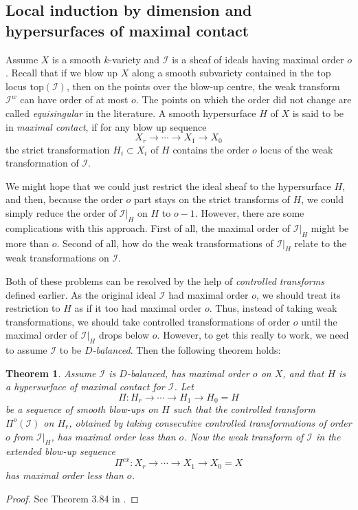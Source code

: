 \documentclass[12pt,a4paper,leqno]{article}
\theoremstyle{plain}
\newtheorem{thm}[theo]{Theorem}
\theoremstyle{definition}
\theoremstyle{remark}
\begin{document}
\subsection{Local induction by dimension and hypersurfaces of maximal contact}

Assume $X$ is a smooth $k$-variety and $\mathscr{I}$ is a sheaf of ideals having maximal order $o$. Recall that if we blow up $X$ along a smooth subvariety contained in the top locus $\mathrm{top} (\mathscr{I})$, then on the points over the blow-up centre, the weak transform $\mathscr{I}^w$ can have order of at most $o$. The points on which the order did not change are called \emph{equisingular} in the literature. A smooth hypersurface $H$ of $X$ is said to be in \emph{maximal contact}, if for any blow up sequence
\begin{equation*}
X_r \to \cdots \to X_1 \to X_0
\end{equation*}
the strict transformation $H_i \subset X_i$ of $H$ contains the order $o$ locus of the weak transformation of $\mathscr{I}$.

We might hope that we could just restrict the ideal sheaf to the hypersurface $H$, and then, because the order $o$ part stays on the strict transforms of $H$, we could simply reduce the order of $\mathscr{I}|_H$ on $H$ to $o-1$. However, there are some complications with this approach. First of all, the maximal order of $\mathscr{I}|_H$ might be more than $o$. Second of all, how do the weak transformations of $\mathscr{I}|_H$ relate to the weak transformations on $\mathscr{I}$.

Both of these problems can be resolved by the help of \emph{controlled transforms} defined earlier. As the original ideal $\mathscr{I}$ had maximal order $o$, we should treat its restriction to $H$ as if it too had maximal order $o$. Thus, instead of taking weak transformations, we should take controlled transformations of order $o$ until the maximal order of $\mathscr{I}|_H$ drops below $o$. However, to get this really to work, we need to assume $\mathscr{I}$ to be \emph{$D$-balanced}. Then the following theorem holds:

\begin{thm}
Assume $\mathscr{I}$ is $D$-balanced, has maximal order $o$ on $X$, and that $H$ is a hypersurface of maximal contact for $\mathscr{I}$. Let
\begin{equation*}
\Pi: H_r \to \cdots \to H_1 \to H_0 = H
\end{equation*}
be a sequence of smooth blow-ups on $H$ such that the controlled transform $\Pi^{o} (\mathscr{I})$ on $H_r$, obtained by taking consecutive controlled transformations of order $o$ from $\mathscr{I}|_H$, has maximal order less than $o$. Now the weak transform of $\mathscr{I}$ in the extended blow-up sequence 
\begin{equation*}
\Pi^{ex}: X_r \to \cdots \to X_1 \to X_0 = X
\end{equation*}
has maximal order less than $o$.
\end{thm}
\begin{proof}
See Theorem 3.84 in \cite{Kol}.
\end{proof}
\end{document}
